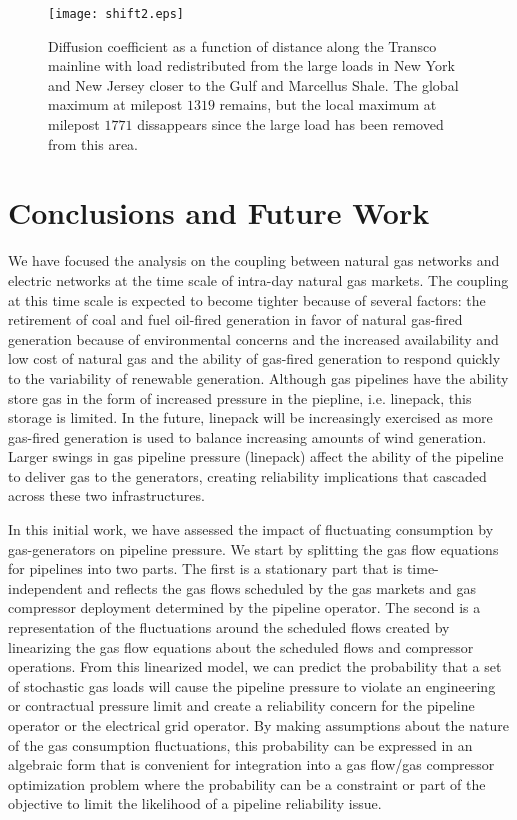 \documentclass[10pt, conference, compsocconf]{IEEEtran}
\begin{document}
\begin{figure}
\centering
\texttt{[image: shift2.eps]}
\caption{Diffusion coefficient as a function of distance along the Transco
mainline with load redistributed from the large loads in New York and New
Jersey closer to the Gulf and Marcellus Shale.
The global maximum at milepost $1319$ remains, but the local maximum
at milepost $1771$ dissappears since the large load has been removed from
this area.
}
\label{shift2}
\end{figure}






\section{Conclusions and Future Work}
\label{sec:con}


We have focused the analysis on the coupling between natural gas networks and electric networks at the time scale of intra-day natural gas markets.  The coupling at this time scale is expected to become tighter because of several factors: the retirement of coal and fuel oil-fired generation in favor of natural gas-fired generation because of environmental concerns and the increased availability and low cost of natural gas and the ability of gas-fired generation to respond quickly to the variability of renewable generation.  Although gas pipelines have the ability store gas in the form of increased pressure in the piepline, i.e. linepack, this storage is limited.  In the future, linepack will be increasingly exercised as more gas-fired generation is used to balance increasing amounts of wind generation.  Larger swings in gas pipeline pressure (linepack) affect the ability of the pipeline to deliver gas to the generators, creating reliability implications that cascaded across these two infrastructures.



In this initial work, we have assessed the impact of fluctuating consumption by gas-generators on pipeline pressure. We start by splitting the gas flow equations for pipelines into two parts.  The first is a stationary part that is time-independent and reflects the gas flows scheduled by the gas markets and gas compressor deployment determined by the pipeline operator.  The second is a representation of the fluctuations around the scheduled flows created by linearizing the gas flow equations about the scheduled flows and compressor operations.  From this linearized model, we can predict the probability that a set of stochastic gas loads will cause the pipeline pressure to violate an engineering or contractual pressure limit and create a reliability concern for the pipeline operator or the electrical grid operator.  By making assumptions about the nature of the gas consumption fluctuations, this probability can be expressed in an algebraic form that is convenient for integration into a gas flow/gas compressor optimization problem where the probability can be a constraint or part of the objective to limit the likelihood of a pipeline reliability issue.
\end{document}
